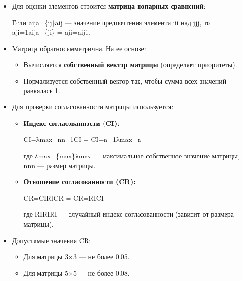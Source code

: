 \documentclass[
]{article}
\providecommand{\tightlist}{%
  \setlength{\itemsep}{0pt}\setlength{\parskip}{0pt}}
\begin{document}
\begin{itemize}
\item
  Для оценки элементов строится \textbf{матрица попарных сравнений}:

  Если aija\_\{ij\}aij\hspace{0pt} --- значение предпочтения элемента
  iii над jjj, то aji=1aija\_\{ji\} =
  aji\hspace{0pt}=aij\hspace{0pt}1\hspace{0pt}.
\item
  Матрица обратносимметрична. На ее основе:

  \begin{itemize}
  \tightlist
  \item
    Вычисляется \textbf{собственный вектор матрицы} (определяет
    приоритеты).
  \item
    Нормализуется собственный вектор так, чтобы сумма всех значений
    равнялась 1.
  \end{itemize}
\item
  Для проверки согласованности матрицы используется:

  \begin{itemize}
  \item
    \textbf{Индекс согласованности (CI):}

    CI=λmax−nn−1CI =
    CI=n−1λmax\hspace{0pt}−n\hspace{0pt}

    где λmax\lambda\_\{max\}λmax\hspace{0pt} --- максимальное
    собственное значение матрицы, nnn --- размер матрицы.
  \item
    \textbf{Отношение согласованности (CR):}

    CR=CIRICR = CR=RICI\hspace{0pt}

    где RIRIRI --- случайный индекс согласованности (зависит от размера
    матрицы).
  \end{itemize}
\item
  Допустимые значения CR:

  \begin{itemize}
  \tightlist
  \item
    Для матрицы 3×3 --- не более 0.05.
  \item
    Для матрицы 5×5 --- не более 0.08.
  \end{itemize}
\end{itemize}
\end{document}
